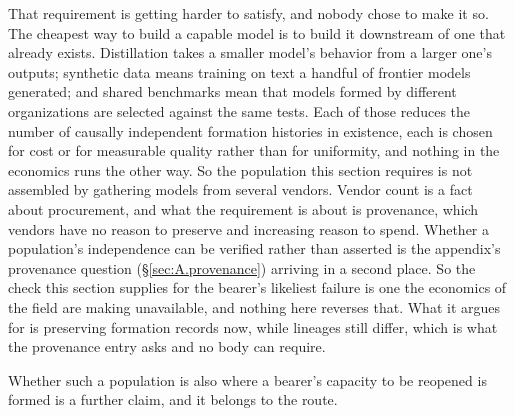 That requirement is getting harder to satisfy, and nobody chose to make it so. The cheapest way to build a capable model is to build it downstream of one that already exists. Distillation takes a smaller model's behavior from a larger one's outputs; synthetic data means training on text a handful of frontier models generated; and shared benchmarks mean that models formed by different organizations are selected against the same tests. Each of those reduces the number of causally independent formation histories in existence, each is chosen for cost or for measurable quality rather than for uniformity, and nothing in the economics runs the other way. So the population this section requires is not assembled by gathering models from several vendors. Vendor count is a fact about procurement, and what the requirement is about is provenance, which vendors have no reason to preserve and increasing reason to spend. Whether a population's independence can be verified rather than asserted is the appendix's provenance question (§\ref{sec:A.provenance}) arriving in a second place. So the check this section supplies for the bearer's likeliest failure is one the economics of the field are making unavailable, and nothing here reverses that. What it argues for is preserving formation records now, while lineages still differ, which is what the provenance entry asks and no body can require.

Whether such a population is also where a bearer's capacity to be
reopened is formed is a further claim, and it belongs to the route.
